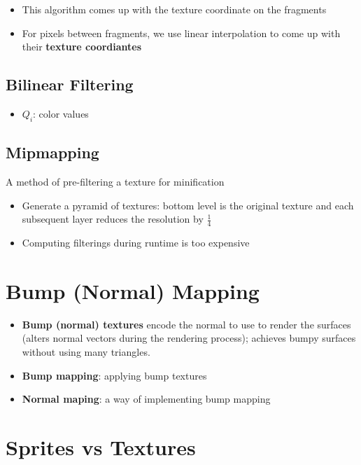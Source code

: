     \begin{itemize}
      \item This algorithm comes up with the texture coordinate on the
      fragments
      \item For pixels between fragments, we use linear interpolation to come
      up with their \textbf{texture coordiantes}
    \end{itemize}

  \subsection{Bilinear Filtering}

    \begin{itemize}
      \item $ Q_{i} $: color values
    \end{itemize}

  \subsection{Mipmapping}

    A method of pre-filtering a texture for minification

    \begin{itemize}
      \item Generate a pyramid of textures: bottom level is the original
      texture and each subsequent layer reduces the resolution
      by $ \frac{1}{4} $
      \item Computing filterings during runtime is too expensive
    \end{itemize}

\section{Bump (Normal) Mapping}

  \begin{itemize}
    \item \textbf{Bump (normal) textures} encode the normal to use to render the
    surfaces (alters normal vectors during the rendering process);
    achieves bumpy surfaces without using many triangles.
    \item \textbf{Bump mapping}: applying bump textures
    \item \textbf{Normal maping}: a way of implementing bump mapping
  \end{itemize}


\section{Sprites vs Textures}

